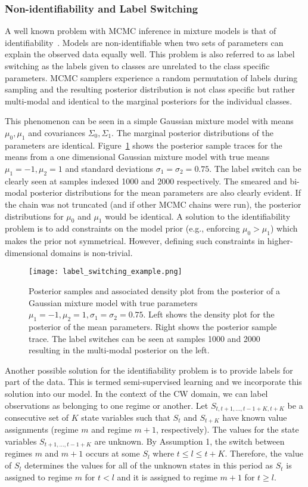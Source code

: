 \subsubsection{Non-identifiability and Label Switching}
A well known problem with MCMC inference in mixture models is that of identifiability~\citep{jasra2005markov}. Models are non-identifiable when two sets of parameters can explain the observed data equally well. This problem is also referred to as label switching as the labels given to classes are unrelated to the class specific parameters. MCMC samplers experience a random permutation of labels during sampling and the resulting posterior distribution is not class specific but rather multi-modal and identical to the marginal posteriors for the individual classes.

This phenomenon can be seen in a simple Gaussian mixture model with means $\mu_0, \mu_1$ and covariances $\Sigma_0, \Sigma_1$. The marginal posterior distributions of the parameters are identical. Figure~\ref{fig:label_switching_example} shows the posterior sample traces for the means from a one dimensional Gaussian mixture model with true means $\mu_1=-1, \mu_2=1$ and standard deviations $\sigma_1=\sigma_2=0.75$. The label switch can be clearly seen at samples indexed 1000 and 2000 respectively. The smeared and bi-modal posterior distributions for the mean parameters are also clearly evident. If the chain was not truncated (and if other MCMC chains were run), the posterior distributions for $\mu_0$ and $\mu_1$ would be identical. A solution to the identifiability problem is to add constraints on the model prior (e.g., enforcing $\mu_0 > \mu_1$) which makes the prior not symmetrical. However, defining such constraints in higher-dimensional domains is non-trivial.

\begin{figure}
  \centering
  \texttt{[image: label\_switching\_example.png]}
  \caption{Posterior samples and associated density plot from the posterior of a Gaussian mixture model with true parameters $\mu_1 = -1, \mu_2=1, \sigma_1=\sigma_2=0.75$. Left shows the density plot for the posterior of the mean parameters. Right shows the posterior sample trace. The label switches can be seen at samples 1000 and 2000 resulting in the multi-modal posterior on the left.}
  \label{fig:label_switching_example}
\end{figure}

Another possible solution for the identifiability problem is to provide labels for part of the data. This is termed semi-supervised learning and we incorporate this solution into our model. In the context of the CW domain, we can label observations as belonging to one regime or another. Let $S_{t, t+1,\ldots, t-1+K,t+K}$ be a consecutive set of $K$ state variables such that $S_t$ and $S_{t+K}$ have known value assignments (regime $m$ and regime $m+1$, respectively). The values for the state variables $S_{t+1,\ldots,t-1+K}$ are unknown. By Assumption 1, the switch between regimes $m$ and $m+1$ occurs at some $S_l$ where $t \leq l \leq t+K$. Therefore, the value of $S_l$ determines the values for all of the unknown states in this period as $S_t$ is assigned to regime $m$ for $t<l$ and it is assigned to regime $m+1$ for $t \geq l$.

